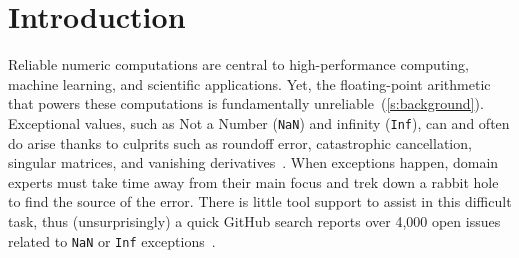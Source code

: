 \documentclass{juliacon}
\begin{document}
\setlength{\parindent}{1.2em}


\maketitle

\begin{abstract}
  Reliable numerical computations are central to high-performance computing and machine learning.
  However, floating-point numbers exhibit non-intuitive behaviors that make writing correct numerical computation difficult.
  In particular, \emph{floating-point exceptions} occur when no mathematically sensible result is available, and it is difficult to find \emph{where} these exceptions occur.
  Unhandled exceptions can cause programs crash, exhibit bad behavior, or worse, silently produce good-looking but incorrect data.
  We present FlowFPX: a tool set for debugging floating-point code.
  FlowFPX can track floating-point exceptions occurring in Julia code to their sources.
  FlowFPX also detects otherwise silent exceptions which can foul program outputs.
  FlowFPX produces intuitive visualizations of summarized exception flows including how they are generated, propagated and killed, thus helping with debugging.
\end{abstract}

\newcommand{\code}[1]{\texttt{#1}}
\newcommand{\FlowFPX}{FlowFPX}
\newcommand{\GPUFPX}{GPU-FPX}
\newcommand{\FloatTracker}{FloatTracker}
\newcommand{\FT}{\FloatTracker}
\newcommand{\Fp}{Floating-point} %
\newcommand{\fp}{floating-point} %
\newcommand{\CSTG}{stack graph}
\newcommand{\CPP}{\code{C++}}
\newcommand{\Dendro}{\textsc{Dendro}}
\newcommand{\urlaccess}[2]{\url{#1}}
\newcommand{\Nan}{\code{NaN}}
\newcommand{\NaN}{\Nan}
\newcommand{\Inf}{\code{Inf}}
\newcommand{\zerowidth}[1]{\makebox[0pt][l]{#1}}
\newcommand{\zerocode}[1]{\zerowidth{\code{#1}}}

\section{Introduction}

Reliable numeric computations are central to high-performance computing,
machine learning, and scientific applications.
Yet, the \fp{} arithmetic that powers these computations is fundamentally
unreliable~(\cref{s:background}).
Exceptional values, such as Not a Number (\Nan{}) and infinity (\Inf{}),
can and often do arise thanks to culprits such as roundoff error,
catastrophic cancellation, singular matrices, and vanishing
derivatives~\cite{sdjmrstp-pc-2022,ddghlllprr-correctness-2022,gllprt-correctness-2021,fpchecker-reports,llg-soap-2022,bllmg-xloop-2022}.
When exceptions happen, domain experts must take time away from their main
focus and trek down a rabbit hole to find the source of the error.
There is little tool support to assist in this difficult task,
thus (unsurprisingly) a quick GitHub search reports over 4,000 open issues
related to \NaN{} or \Inf{} exceptions~\cite{github-issues}.
\end{document}
